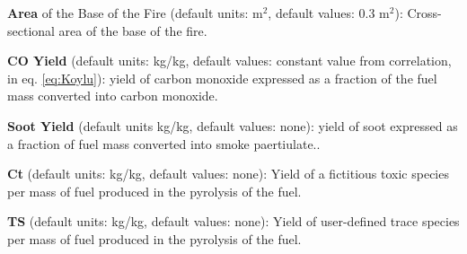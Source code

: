 \textbf{Area} of the Base of the Fire (default units: m$^2$, default values: 0.3 m$^2$): Cross-sectional area of the base of the fire.

\textbf{CO Yield} (default units: kg/kg, default values: constant value from correlation, in eq. \ref{eq:Koylu}): yield of carbon monoxide expressed as a fraction of the fuel mass converted into carbon monoxide.

\textbf{Soot Yield} (default units kg/kg, default values: none): yield of soot expressed as a fraction of fuel mass converted into smoke paertiulate..

\textbf{Ct} (default units: kg/kg, default values: none): Yield of a fictitious toxic species per mass of fuel produced in the pyrolysis of the fuel.

\textbf{TS} (default units: kg/kg, default values: none): Yield of user-defined trace species per mass of fuel produced in the pyrolysis of the fuel.

